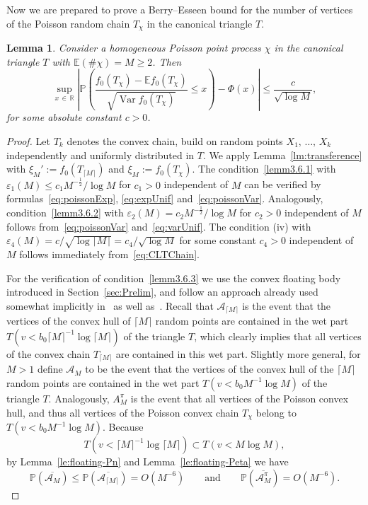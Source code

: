 \documentclass[10pt]{amsart}
\newtheorem{lemm}[theo]{Lemma}\newtheorem{prop}[theo]{Proposition}\newtheorem{coro}[theo]{Corollary}\newtheorem{conj}[theo]{Conjecture}
\theoremstyle{definition}\newtheorem{defi}[theo]{Definition}\newtheorem{rema}[theo]{Remark}\newtheorem{exam}[theo]{Example}\newtheorem{exem}[theo]{Example}\newtheorem{nota}[theo]{Notation}
\newcommand{\var}{\operatorname{Var}}
\newcommand{\bbR}{\mathbb{R}}
\newcommand{\bbE}{\mathbb{E}}
\newcommand{\bbP}{\mathbb{P}}
\newcommand{\clA}{\mathcal{A}}
\begin{document}
Now we are prepared to prove a Berry--Esseen bound for the number of vertices of the Poisson random chain $T_\chi$ in the canonical triangle $T$.

\begin{lemm}\label{lm:BerryEssenPoissonChain}
Consider a homogeneous Poisson point process $\chi$ in the canonical triangle $T$ with $\bbE(\# \chi)=M \geq 2$. Then
\[
\sup_{x\,\in\,\bbR}\left|\bbP\left(\frac{f_0(T_\chi)-\bbE f_0(T_\chi)}{\sqrt{\var f_0(T_\chi)}}\leq x\right)-\Phi(x)\right|\leq \frac{c}{\sqrt{\log M}},
\]
for some absolute constant $c>0$.
\end{lemm}

\begin{proof}
Let $T_k$ denotes the convex chain, build on random points $X_1,\,\ldots,\,X_k$ independently and uniformly distributed in $T$. We apply Lemma~\ref{lm:transference} with $\xi_M':=f_0(T_{\lceil M\rceil})$ and $\xi_M:=f_0(T_{\chi})$. The condition~\eqref{lemm3.6.1} with $\varepsilon_1(M) \leq c_1 M^{- \frac 12}/\log M$ for $c_1>0$ independent of $M$ can be verified by formulas~\eqref{eq:poissonExp}, \eqref{eq:expUnif} and~\eqref{eq:poissonVar}. Analogously, condition~\eqref{lemm3.6.2} with $\varepsilon_2(M)=c_2M^{- \frac 12}/\log M$ for $c_2>0$ independent of $M$ follows from~\eqref{eq:poissonVar} and~\eqref{eq:varUnif}. The condition (iv) with $\varepsilon_4(M)=c/\sqrt{\log \lceil M\rceil}=c_4/\sqrt{\log M}$ for some constant $c_4>0$ independent of $M$ follows immediately from~\eqref{eq:CLTChain}.

For the verification of condition~\eqref{lemm3.6.3} we use the convex floating body introduced in Section~\ref{sec:Prelim}, and follow an approach already used somewhat implicitly in~\cite{Gro88} as well as~\cite{Reitz05}. Recall that $\clA_{\lceil M \rceil}$ is the event that the vertices of the convex hull of ${\lceil M \rceil}$ random points are contained in the wet part $T(v< b_0 {\lceil M \rceil}^{-1}\log {\lceil M \rceil})$ of the triangle $T$, which clearly implies that all vertices of the convex chain $T_{\lceil M \rceil}$ are contained in this wet part. Slightly more general, for $M>1$ define $\clA_{M }$ to be the event that the vertices of the convex hull of the ${\lceil M \rceil}$ random points are contained in the wet part $T(v< b_0 {M}^{-1}\log {M})$ of the triangle $T$. Analogously, $A^\pi_M$ is the event that all vertices of the Poisson convex hull, and thus all vertices of the Poisson convex chain $T_{\chi}$ belong to $T(v< b_0 M^{-1}\log M)$. Because
\[
T\left(v < \lceil M \rceil^{-1} \log \lceil M \rceil\right) \subset T(v< M \log M),
\]
by Lemma~\ref{le:floating-Pn} and Lemma~\ref{le:floating-Peta} we have
\[
\bbP(\overline{\clA_{M}}) \leq \bbP(\overline{\clA_{\lceil M \rceil}}) = O\left(M^{-6}\right)\qquad\text{and}\qquad
\bbP(\overline{\clA^\pi_M}) = O\left(M^{-6}\right).
\]


\end{proof}
\end{document}
